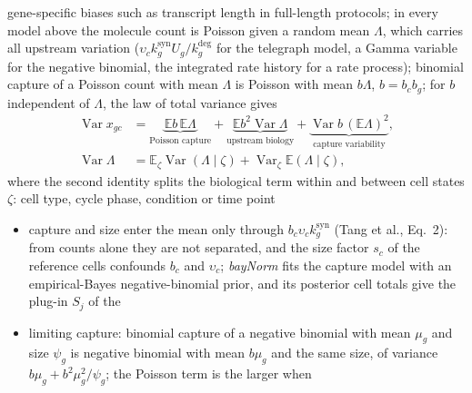 \begin{itemize}
        gene-specific biases such as transcript length in full-length protocols; in every model above the molecule
        count is Poisson given a random mean \(\Lambda\), which carries all upstream variation (\(\upsilon_{c}k^{\mathrm{syn}}_{g}U_{g}/k^{\mathrm{deg}}_{g}\) for the
        telegraph model, a Gamma variable for the negative binomial, the integrated rate history for a rate process);
        binomial capture of a Poisson count with mean \(\Lambda\) is Poisson with mean \(b\Lambda\), \(b=b_{c}b_{g}\); for \(b\)
        independent of \(\Lambda\), the law of total variance gives
        \begin{equation}
          \begin{aligned}
            \operatorname{Var}x_{gc}
            &=\underbrace{\mathbb{E}b\,\mathbb{E}\Lambda}_{\text{Poisson capture}}
            +\underbrace{\mathbb{E}b^{2}\operatorname{Var}\Lambda}_{\text{upstream biology}}
            +\underbrace{\operatorname{Var}b\,(\mathbb{E}\Lambda)^{2}}_{\text{capture variability}},\\
            \operatorname{Var}\Lambda
            &=\mathbb{E}_{\zeta}\operatorname{Var}(\Lambda\mid\zeta)+\operatorname{Var}_{\zeta}\mathbb{E}(\Lambda\mid\zeta),
          \end{aligned}
          \label{eq:dyn-variance-split}
        \end{equation}
        where the second identity splits the biological term within and between cell states \(\zeta\): cell type, cycle
        phase, condition or time point
  \begin{itemize}
    \item capture and size enter the mean only through \(b_{c}\upsilon_{c}k^{\mathrm{syn}}_{g}\) (Tang et al., Eq.~2): from counts alone
          they are not separated, and the size factor \(s_{c}\) of the reference cells confounds \(b_{c}\) and \(\upsilon_{c}\);
          \emph{bayNorm} fits the capture model with an empirical-Bayes negative-binomial prior, and its posterior cell totals
          give the plug-in \(S_{j}\) of the
    \item limiting capture: binomial capture of a negative binomial with mean \(\mu_{g}\) and size \(\psi_{g}\) is negative
          binomial with mean \(b\mu_{g}\) and the same size, of variance \(b\mu_{g}+b^{2}\mu_{g}^{2}/\psi_{g}\); the Poisson term is the
          larger when

\end{itemize}
\end{itemize}
